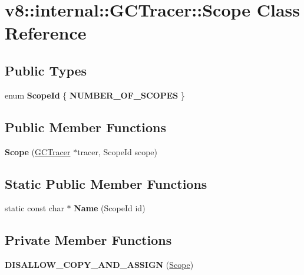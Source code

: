\hypertarget{classv8_1_1internal_1_1_g_c_tracer_1_1_scope}{}\section{v8\+:\+:internal\+:\+:G\+C\+Tracer\+:\+:Scope Class Reference}
\label{classv8_1_1internal_1_1_g_c_tracer_1_1_scope}
\subsection*{Public Types}
\begin{DoxyCompactItemize}
\item 
enum {\bfseries Scope\+Id} \{ {\bfseries N\+U\+M\+B\+E\+R\+\_\+\+O\+F\+\_\+\+S\+C\+O\+P\+ES}
 \}\hypertarget{classv8_1_1internal_1_1_g_c_tracer_1_1_scope_a6702624408f5af3d30559d5d02371891}{}\label{classv8_1_1internal_1_1_g_c_tracer_1_1_scope_a6702624408f5af3d30559d5d02371891}

\end{DoxyCompactItemize}
\subsection*{Public Member Functions}
\begin{DoxyCompactItemize}
\item 
{\bfseries Scope} (\hyperlink{classv8_1_1internal_1_1_g_c_tracer}{G\+C\+Tracer} $\ast$tracer, Scope\+Id scope)\hypertarget{classv8_1_1internal_1_1_g_c_tracer_1_1_scope_a8ef5876b55fd9d305d2b9df8c1d6dcf3}{}\label{classv8_1_1internal_1_1_g_c_tracer_1_1_scope_a8ef5876b55fd9d305d2b9df8c1d6dcf3}

\end{DoxyCompactItemize}
\subsection*{Static Public Member Functions}
\begin{DoxyCompactItemize}
\item 
static const char $\ast$ {\bfseries Name} (Scope\+Id id)\hypertarget{classv8_1_1internal_1_1_g_c_tracer_1_1_scope_a9b8c6d78e8e1c0a676dfda714819ddf8}{}\label{classv8_1_1internal_1_1_g_c_tracer_1_1_scope_a9b8c6d78e8e1c0a676dfda714819ddf8}

\end{DoxyCompactItemize}
\subsection*{Private Member Functions}
\begin{DoxyCompactItemize}
\item 
{\bfseries D\+I\+S\+A\+L\+L\+O\+W\+\_\+\+C\+O\+P\+Y\+\_\+\+A\+N\+D\+\_\+\+A\+S\+S\+I\+GN} (\hyperlink{classv8_1_1internal_1_1_g_c_tracer_1_1_scope}{Scope})\hypertarget{classv8_1_1internal_1_1_g_c_tracer_1_1_scope_a9325ecf31f93409d28d3c2528d49aead}{}\label{classv8_1_1internal_1_1_g_c_tracer_1_1_scope_a9325ecf31f93409d28d3c2528d49aead}

\end{DoxyCompactItemize}
